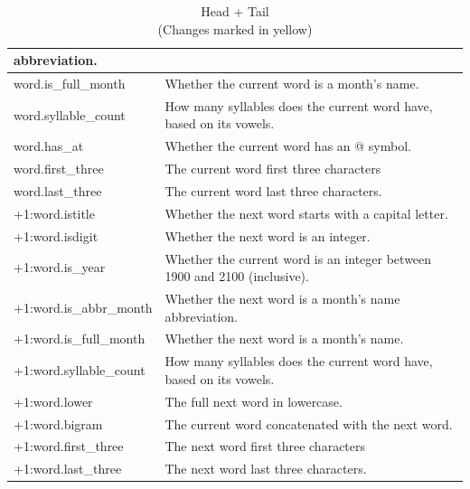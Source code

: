 \begin{table}[ht]
\begin{tabular}{|p{0.3\linewidth}|p{0.7\linewidth}|}
      abbreviation. \\
      \hline
      \rowcolor{blue}
      word.is\_full\_month & Whether the current word is a month's name. \\
      \hline
      \rowcolor{blue}
      word.syllable\_count & How many syllables does the current word have,
      based on its vowels. \\
      \hline
      \rowcolor{blue}
      word.has\_at & Whether the current word has an @ symbol. \\
      \hline
      \rowcolor{pale_yellow}
      word.first\_three & The current word first three characters \\
      \hline
      \rowcolor{pale_yellow}
      word.last\_three & The current word last three characters. \\
      \hline
      \rowcolor{light_blue}
      +1:word.istitle & Whether the next word starts with a capital letter. \\
      \hline
      \rowcolor{light_blue}
      +1:word.isdigit & Whether the next word is an integer. \\
      \hline
      \rowcolor{light_blue}
      +1:word.is\_year & Whether the current word is an integer between 1900
      and 2100 (inclusive). \\
      \hline
      \rowcolor{light_blue}
      +1:word.is\_abbr\_month & Whether the next word is a month's name
      abbreviation. \\
      \hline
      \rowcolor{light_blue}
      +1:word.is\_full\_month & Whether the next word is a month's name. \\
      \hline
      \rowcolor{light_blue}
      +1:word.syllable\_count & How many syllables does the current word have,
      based on its vowels. \\
      \hline
      \rowcolor{light_blue}
      +1:word.lower & The full next word in lowercase. \\
      \hline
      \rowcolor{light_blue}
      +1:word.bigram & The current word concatenated with the next word. \\
      \hline
      \rowcolor{pale_yellow}
      +1:word.first\_three & The next word first three characters \\
      \hline
      \rowcolor{pale_yellow}
      +1:word.last\_three & The next word last three characters. \\
      \hline
    \end{tabular}
    \caption{Head + Tail \\ \textnormal{(Changes marked in yellow)}}
    \label{table:2}
  \end{table}

